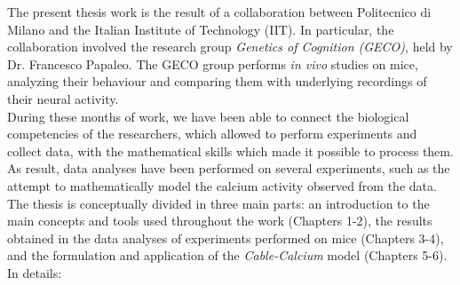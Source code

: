 \documentclass[12pt, a4paper]{report}
\begin{document}
	The present thesis work is the result of a collaboration between Politecnico di Milano and the Italian Institute of Technology (IIT). In particular, the collaboration involved the research group  \textit{Genetics of Cognition (GECO)}, held by Dr. Francesco Papaleo. The GECO group performs \textit{in vivo} studies on mice, analyzing their behaviour and comparing them with underlying recordings of their neural activity.\\
	During these months of work, we have been able to connect the biological competencies of the researchers, which allowed to perform experiments and collect data, with the mathematical skills which made it possible to process them. As result, data analyses have been performed on several experiments, such as  the attempt to mathematically model the  calcium activity observed from the data.\\
	The  thesis is conceptually divided in three main parts: an introduction to the main concepts and tools used throughout the work (Chapters 1-2), the results obtained in the data analyses of experiments performed on mice (Chapters 3-4), and the formulation and application of the \textit{Cable-Calcium} model (Chapters 5-6). In details:
	
\end{document}
